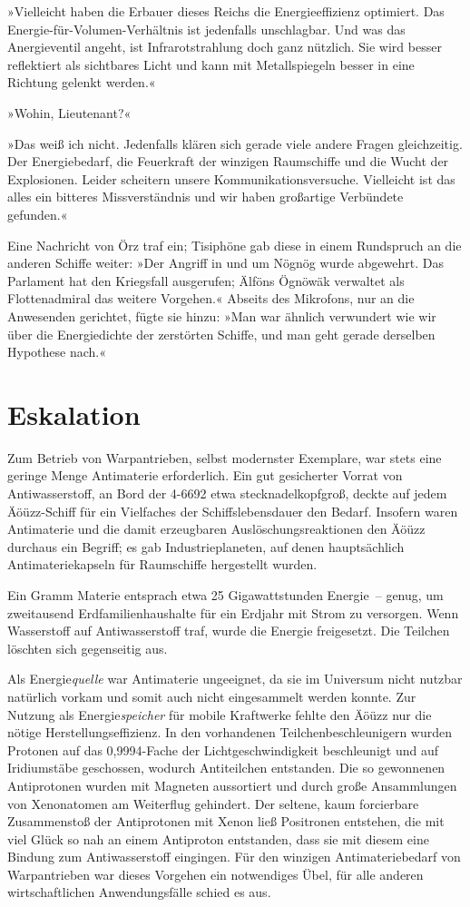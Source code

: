 »Vielleicht haben die Erbauer dieses Reichs die Energieeffizienz optimiert. Das Energie-für-Volumen-Verhältnis ist jedenfalls unschlagbar. Und was das Anergieventil angeht, ist Infrarotstrahlung doch ganz nützlich. Sie wird besser reflektiert als sichtbares Licht und kann mit Metallspiegeln besser in eine Richtung gelenkt werden.«

»Wohin, Lieutenant?«

»Das weiß ich nicht. Jedenfalls klären sich gerade viele andere Fragen gleichzeitig. Der Energiebedarf, die Feuerkraft der winzigen Raumschiffe und die Wucht der Explosionen. Leider scheitern unsere Kommunikationsversuche. Vielleicht ist das alles ein bitteres Missverständnis und wir haben großartige Verbündete gefunden.«

Eine Nachricht von Örz traf ein; Tisiphöne gab diese in einem Rundspruch an die anderen Schiffe weiter: »Der Angriff in und um Nögnög wurde abgewehrt. Das Parlament hat den Kriegsfall ausgerufen; Älföns Ögnöwäk verwaltet als Flottenadmiral das weitere Vorgehen.« Abseits des Mikrofons, nur an die Anwesenden gerichtet, fügte sie hinzu: »Man war ähnlich verwundert wie wir über die Energiedichte der zerstörten Schiffe, und man geht gerade derselben Hypothese nach.«


\chapter{Eskalation}

Zum Betrieb von Warpantrieben, selbst modernster Exemplare, war stets eine geringe Menge Antimaterie erforderlich. Ein gut gesicherter Vorrat von Antiwasserstoff, an Bord der 4-6692 etwa stecknadelkopfgroß, deckte auf jedem Äöüzz-Schiff für ein Vielfaches der Schiffslebensdauer den Bedarf. Insofern waren Antimaterie und die damit erzeugbaren Auslöschungsreaktionen den Äöüzz durchaus ein Begriff; es gab Industrieplaneten, auf denen hauptsächlich Antimateriekapseln für Raumschiffe hergestellt wurden.

Ein Gramm Materie entsprach etwa 25 Gigawattstunden Energie~– genug, um zweitausend Erdfamilienhaushalte für ein Erdjahr mit Strom zu versorgen. Wenn Wasserstoff auf Antiwasserstoff traf, wurde die Energie freigesetzt. Die Teilchen löschten sich gegenseitig aus.

Als Energie\emph{quelle} war Antimaterie ungeeignet, da sie im Universum nicht nutzbar natürlich vorkam und somit auch nicht eingesammelt werden konnte. Zur Nutzung als Energie\emph{speicher} für mobile Kraftwerke fehlte den Äöüzz nur die nötige Herstellungseffizienz. In den vorhandenen Teilchenbeschleunigern wurden Protonen auf das 0,9994-Fache der Lichtgeschwindigkeit beschleunigt und auf Iridiumstäbe geschossen, wodurch Antiteilchen entstanden. Die so gewonnenen Antiprotonen wurden mit Magneten aussortiert und durch große Ansammlungen von Xenonatomen am Weiterflug gehindert. Der seltene, kaum forcierbare Zusammenstoß der Antiprotonen mit Xenon ließ Positronen entstehen, die mit viel Glück so nah an einem Antiproton entstanden, dass sie mit diesem eine Bindung zum Antiwasserstoff eingingen. Für den winzigen Antimateriebedarf von Warpantrieben war dieses Vorgehen ein notwendiges Übel, für alle anderen wirtschaftlichen Anwendungsfälle schied es aus.

